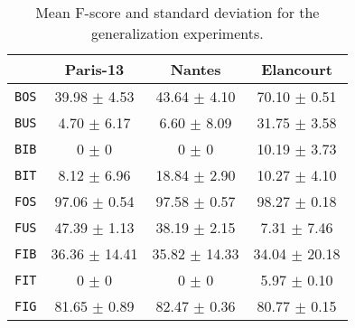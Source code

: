         \begin{table}
            \footnotesize
            \begin{tabular}{c c c c}
                \toprule
                & \textbf{Paris-13} & \textbf{Nantes} & \textbf{Elancourt}\\
                \midrule
                \texttt{BOS} & 39.98 $\pm$ 4.53 & 43.64 $\pm$ 4.10 & 70.10 $\pm$ 0.51 \\
                \midrule
                \texttt{BUS} & 4.70 $\pm$ 6.17 & 6.60 $\pm$ 8.09 & 31.75 $\pm$ 3.58 \\
                \midrule
                \texttt{BIB} & 0 $\pm$ 0 & 0 $\pm$ 0 & 10.19 $\pm$ 3.73 \\
                \midrule
                \texttt{BIT} & 8.12 $\pm$ 6.96 & 18.84 $\pm$ 2.90 & 10.27 $\pm$ 4.10 \\
                \midrule
                \midrule
                \texttt{FOS} & 97.06 $\pm$ 0.54 & 97.58 $\pm$ 0.57 & 98.27 $\pm$ 0.18 \\
                \midrule
                \texttt{FUS} & 47.39 $\pm$ 1.13 & 38.19 $\pm$ 2.15 & 7.31 $\pm$ 7.46 \\
                \midrule
                \texttt{FIB} & 36.36 $\pm$ 14.41 & 35.82 $\pm$ 14.33 & 34.04 $\pm$ 20.18 \\
                \midrule
                \texttt{FIT} & 0 $\pm$ 0 & 0 $\pm$ 0 & 5.97 $\pm$ 0.10 \\
                \midrule
                \texttt{FIG} & 81.65 $\pm$ 0.89 & 82.47 $\pm$ 0.36 & 80.77 $\pm$ 0.15 \\
                \bottomrule
            \end{tabular}
            \caption{
                \label{tab::f_score_generalization_f3} Mean F-score and standard deviation for the generalization experiments.
            }
        \end{table}
    
